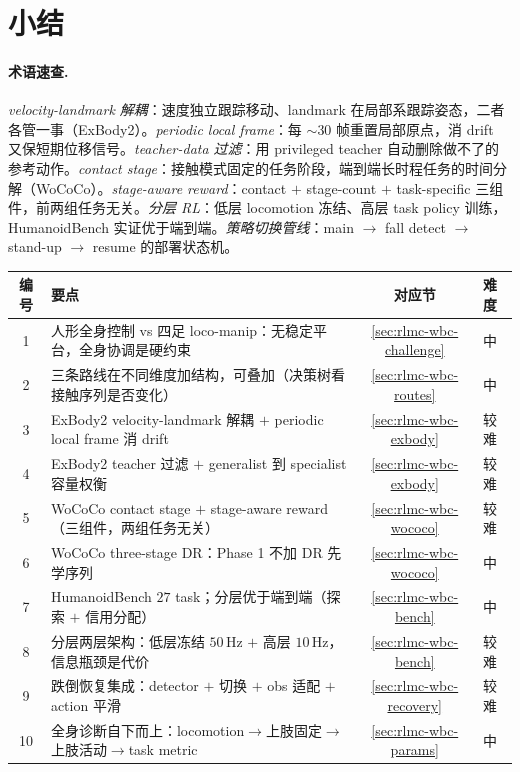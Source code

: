 \section*{小结}

\paragraph{术语速查.}
\emph{velocity-landmark 解耦}：速度独立跟踪移动、landmark 在局部系跟踪姿态，二者各管一事（ExBody2）。\emph{periodic local frame}：每 $\sim 30$ 帧重置局部原点，消 drift 又保短期位移信号。\emph{teacher-data 过滤}：用 privileged teacher 自动删除做不了的参考动作。\emph{contact stage}：接触模式固定的任务阶段，端到端长时程任务的时间分解（WoCoCo）。\emph{stage-aware reward}：contact $+$ stage-count $+$ task-specific 三组件，前两组任务无关。\emph{分层 RL}：低层 locomotion 冻结、高层 task policy 训练，HumanoidBench 实证优于端到端。\emph{策略切换管线}：main $\to$ fall detect $\to$ stand-up $\to$ resume 的部署状态机。

\begin{center}
\small
\begin{tabular}{clcl}
\hline
编号 & 要点 & 对应节 & 难度 \\
\hline
1 & 人形全身控制 vs 四足 loco-manip：无稳定平台，全身协调是硬约束 & \cref{sec:rlmc-wbc-challenge} & 中 \\
2 & 三条路线在不同维度加结构，可叠加（决策树看接触序列是否变化） & \cref{sec:rlmc-wbc-routes} & 中 \\
3 & ExBody2 velocity-landmark 解耦 $+$ periodic local frame 消 drift & \cref{sec:rlmc-wbc-exbody} & 较难 \\
4 & ExBody2 teacher 过滤 $+$ generalist 到 specialist 容量权衡 & \cref{sec:rlmc-wbc-exbody} & 较难 \\
5 & WoCoCo contact stage $+$ stage-aware reward（三组件，两组任务无关） & \cref{sec:rlmc-wbc-wococo} & 较难 \\
6 & WoCoCo three-stage DR：Phase 1 不加 DR 先学序列 & \cref{sec:rlmc-wbc-wococo} & 中 \\
7 & HumanoidBench $27$ task；分层优于端到端（探索 $+$ 信用分配） & \cref{sec:rlmc-wbc-bench} & 中 \\
8 & 分层两层架构：低层冻结 $50$\,Hz $+$ 高层 $10$\,Hz，信息瓶颈是代价 & \cref{sec:rlmc-wbc-bench} & 较难 \\
9 & 跌倒恢复集成：detector $+$ 切换 $+$ obs 适配 $+$ action 平滑 & \cref{sec:rlmc-wbc-recovery} & 较难 \\
10 & 全身诊断自下而上：locomotion$\to$上肢固定$\to$上肢活动$\to$task metric & \cref{sec:rlmc-wbc-params} & 中 \\
\hline
\end{tabular}
\end{center}

